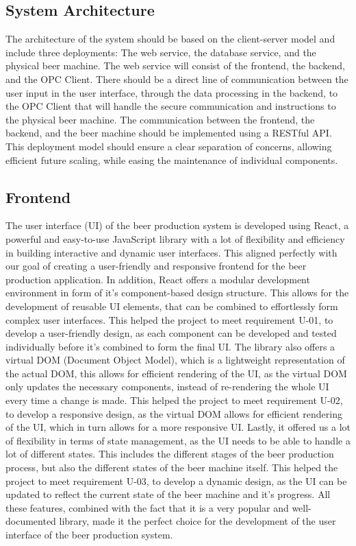 \subsection{System Architecture}
The architecture of the system should be based on the client-server model and include three deployments: The web service, the database service, and the physical beer machine. \newline
The web service will consist of the frontend, the backend, and the OPC Client. There should be a direct line of communication between the user input in the user interface, through the data processing in the backend, to the OPC Client that will handle the secure communication and instructions to the physical beer machine. \newline
The communication between the frontend, the backend, and the beer machine should be implemented using a RESTful API. \newline
This deployment model should ensure a clear separation of concerns, allowing efficient future scaling, while easing the maintenance of individual components.

\subsection{Frontend}
The user interface (UI) of the beer production system is developed using React, a powerful and easy-to-use JavaScript library with a lot of flexibility and efficiency in building interactive and dynamic user interfaces. This aligned perfectly with our goal of creating a user-friendly and responsive frontend for the beer production application.
In addition, React offers a modular development environment in form of it's component-based design structure. This allows for the development of reusable UI elements, that can be combined to effortlessly form complex user interfaces. This helped the project to meet requirement U-01, to develop a user-friendly design, as each component can be developed and tested individually before it's combined to form the final UI. \newline
The library also offers a virtual DOM (Document Object Model), which is a lightweight representation of the actual DOM, this allows for efficient rendering of the UI, as the virtual DOM only updates the necessary components, instead of re-rendering the whole UI every time a change is made. This helped the project to meet requirement U-02, to develop a responsive design, as the virtual DOM allows for efficient rendering of the UI, which in turn allows for a more responsive UI. \newline
Lastly, it offered us a lot of flexibility in terms of state management, as the UI needs to be able to handle a lot of different states. This includes the different stages of the beer production process, but also the different states of the beer machine itself. This helped the project to meet requirement U-03, to develop a dynamic design, as the UI can be updated to reflect the current state of the beer machine and it's progress. \newline
All these features, combined with the fact that it is a very popular and well-documented library, made it the perfect choice for the development of the user interface of the beer production system.
